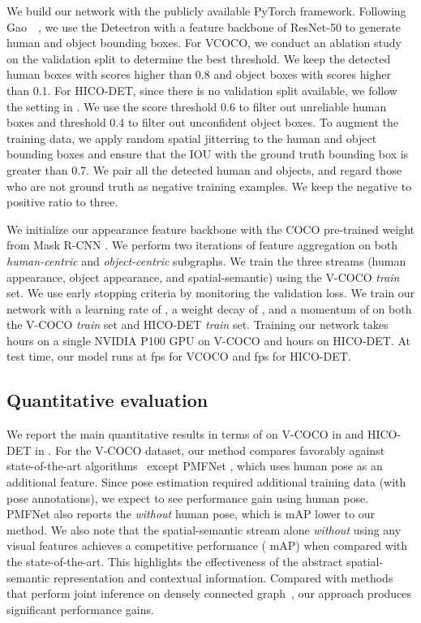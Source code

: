 We build our network with the publicly available PyTorch framework.
Following Gao~\etal~\cite{Gao-BMVC-iCAN}, we use the Detectron \cite{Detectron} with a feature backbone of ResNet-50 to generate human and object bounding boxes.
For VCOCO, we conduct an ablation study on the validation split to determine the best threshold. We keep the detected human boxes with scores  higher than 0.8 and object boxes with scores  higher than 0.1. 
For HICO-DET, since there is no validation split available, we follow the setting in \cite{peyre2018detecting}. We use the score threshold 0.6 to filter out unreliable human boxes and threshold 0.4 to filter out unconfident object boxes.
To augment the training data, we apply random spatial jitterring to the human and object bounding boxes and ensure that the IOU with the ground truth bounding box is greater than 0.7.
We pair all the detected human and objects, and regard those who are not ground truth as negative training examples. 
We keep the negative to positive ratio to three.

We initialize our appearance feature backbone with the COCO pre-trained weight from Mask R-CNN \cite{He-ICCV-MaskRCNN}.
We perform two iterations of feature aggregation on both \emph{human-centric} and \emph{object-centric} subgraphs. 
We train the three streams (human appearance, object appearance, and spatial-semantic) using the V-COCO \emph{train} set.
We use early stopping criteria by monitoring the validation loss.
We train our network with a learning rate of , a weight decay of , and a momentum of  on both the V-COCO \emph{train} set and HICO-DET \emph{train} set. 
Training our network takes  hours on a single NVIDIA P100 GPU on V-COCO and  hours on HICO-DET.
At test time, our model runs at  fps for VCOCO and  fps for HICO-DET.




\subsection{Quantitative evaluation}


We report the main quantitative results in terms of  on V-COCO in  and HICO-DET in .
For the V-COCO dataset, our method compares favorably against state-of-the-art algorithms~\cite{Li-CVPR-Interactiveness,wang2019deep,zhou2019relation} except PMFNet \cite{Bo-PMFNet}, which uses human pose as an additional feature.
Since pose estimation required additional training data (with pose annotations), we expect to see performance gain using human pose.
PMFNet \cite{Bo-PMFNet} also reports the  \emph{without} human pose, which is  mAP lower to our method. 
We also note that the spatial-semantic stream alone \emph{without} using any visual features achieves a competitive performance ( mAP) when compared with the state-of-the-art. 
This highlights the effectiveness of the abstract spatial-semantic representation and contextual information.
Compared with methods that perform joint inference on densely connected graph~\cite{Qi-ECCV-GraphParsing},
our approach produces significant performance gains.

